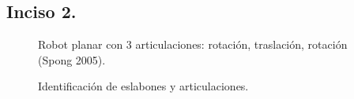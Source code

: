 \documentclass[a4paper,12pt]{article}
\begin{document}
\subsection{Inciso 2.}

\begin{figure}[H]
    \centering
    \begin{adjustbox}{scale = 0.5, max width=\columnwidth}
    \end{adjustbox}
    \caption{Robot planar con 3 articulaciones: rotación, traslación, rotación (Spong 2005).}
\end{figure}

\begin{figure}[H]
    \centering
    \begin{adjustbox}{scale = 0.5, max width=\columnwidth}
    \end{adjustbox}
    \caption{Identificación de eslabones y articulaciones.}
\end{figure}
\end{document}
